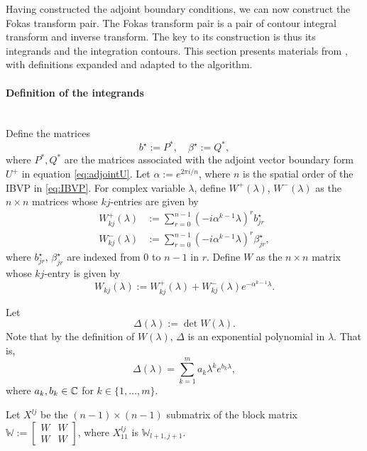 \documentclass[12pt, oneside, a4paper]{article}
\begin{document}
Having constructed the adjoint boundary conditions, we can now construct the Fokas transform pair. The Fokas transform pair is a pair of contour integral transform and inverse transform. The key to its construction is thus its integrands and the integration contours. This section presents materials from \cite{Smith2016}, with definitions expanded and adapted to the algorithm.

\paragraph{Definition of the integrands}\label{sec:integrand_defn}\mbox{}\\
Define the matrices 
\[b^\star := P^*,\quad \beta^\star := Q^*,\]
where $P^*, Q^*$ are the matrices associated with the adjoint vector boundary form $U^+$ in equation \ref{eq:adjointU}.
Let $\alpha := e^{2\pi i/n}$, where $n$ is the spatial order of the IBVP in \eqref{eq:IBVP}. For complex variable $\lambda$, define $W^+(\lambda)$, $W^-(\lambda)$ as the $n\times n$ matrices whose $kj$-entries are given by
\begin{subequations}\label{eq:M+/-}
    \begin{align}
        W^+_{kj}(\lambda) &:= \sum_{r=0}^{n-1}(-i\alpha^{k-1}\lambda)^r b^\star_{jr}\label{eq:M+}\\
        W^-_{kj}(\lambda) &:= \sum_{r=0}^{n-1}(-i\alpha^{k-1}\lambda)^r \beta^\star_{jr},\label{eq:M-}
    \end{align}
\end{subequations}
where $b^\star_{jr}$, $\beta^\star_{jr}$ are indexed from $0$ to $n-1$ in $r$. Define $W$ as the $n\times n$ matrix whose $kj$-entry is given by
\begin{equation}\label{eq:M}
    W_{kj}(\lambda) := W^+_{kj}(\lambda) + W^-_{kj}(\lambda)e^{-\alpha^{k-1}\lambda}.
\end{equation}

Let
\begin{equation}\label{eq:delta}
    \Delta(\lambda):=\det W(\lambda).
\end{equation}
Note that by the definition of $W(\lambda)$, $\Delta$ is an exponential polynomial in $\lambda$. That is,
\[\Delta(\lambda) = \sum_{k=1}^m a_k \lambda^k e^{b_k\lambda},\]
where $a_k, b_k\in\mathbb C$ for $k\in\{1,\ldots,m\}$.

Let $X^{lj}$ be the $(n-1)\times (n-1)$ submatrix of the block matrix $\mathbb{W}:=\begin{bmatrix}W & W\\ W & W\end{bmatrix}$, where $X^{lj}_{11}$ is $\mathbb{W}_{l+1, j+1}$.
\end{document}
